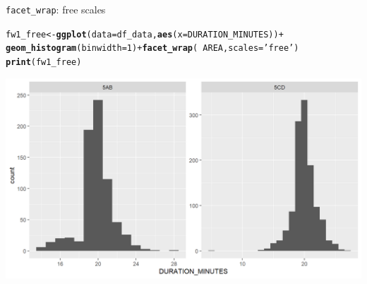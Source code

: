 \documentclass{beamer}\usepackage[]{graphicx}\usepackage[]{color}
\makeatletter
\newcommand{\hlnum}[1]{\textcolor[rgb]{0.686,0.059,0.569}{#1}}%
\newcommand{\hlstr}[1]{\textcolor[rgb]{0.192,0.494,0.8}{#1}}%
\newcommand{\hlopt}[1]{\textcolor[rgb]{0,0,0}{#1}}%
\newcommand{\hlstd}[1]{\textcolor[rgb]{0.345,0.345,0.345}{#1}}%
\newcommand{\hlkwb}[1]{\textcolor[rgb]{0.69,0.353,0.396}{#1}}%
\newcommand{\hlkwc}[1]{\textcolor[rgb]{0.333,0.667,0.333}{#1}}%
\newcommand{\hlkwd}[1]{\textcolor[rgb]{0.737,0.353,0.396}{\textbf{#1}}}%
\newenvironment{kframe}{%
 \def\at@end@of@kframe{}%
 \ifinner\ifhmode%
  \def\at@end@of@kframe{\end{minipage}}%
  \begin{minipage}{\columnwidth}%
 \fi\fi%
 \def\FrameCommand##1{\hskip\@totalleftmargin \hskip-\fboxsep
 \colorbox{shadecolor}{##1}\hskip-\fboxsep
     \hskip-\linewidth \hskip-\@totalleftmargin \hskip\columnwidth}%
 \MakeFramed {\advance\hsize-\width
   \@totalleftmargin\z@ \linewidth\hsize
   \@setminipage}}%
 {\par\unskip\endMakeFramed%
 \at@end@of@kframe}
\newenvironment{knitrout}{}{} %
\makeatother
\begin{document}
\begin{frame}[fragile]{\lstinline{facet_wrap}: free scales}
\begin{knitrout}\footnotesize
{}\color{fgcolor}\begin{kframe}
\begin{alltt}
\hlstd{fw1_free} \hlkwb{<-} \hlkwd{ggplot}\hlstd{(}\hlkwc{data}\hlstd{=df_data,} \hlkwd{aes}\hlstd{(}\hlkwc{x}\hlstd{=DURATION_MINUTES))} \hlopt{+}
  \hlkwd{geom_histogram}\hlstd{(}\hlkwc{binwidth}\hlstd{=}\hlnum{1}\hlstd{)} \hlopt{+} \hlkwd{facet_wrap}\hlstd{(}\hlopt{~} \hlstd{AREA ,} \hlkwc{scales} \hlstd{=} \hlstr{'free'}\hlstd{)}
\hlkwd{print}\hlstd{(fw1_free)}
\end{alltt}
\end{kframe}

{\centering \includegraphics[width=.9\linewidth]{figure/facet_wrap_2-1} 

}



\end{knitrout}
\end{frame}
\end{document}
